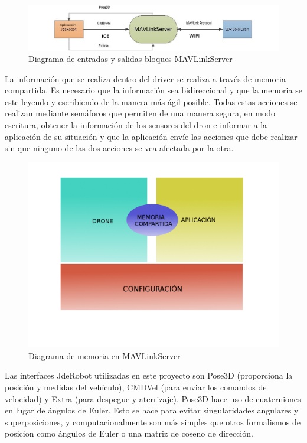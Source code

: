\begin{figure}[H]
  \centering
  \includegraphics[scale=0.65]{imagenes/cajaNegraNueva.png}
  \caption{Diagrama de entradas y salidas bloques MAVLinkServer}
  \label{fig:mavLinkJdeRobotNegra}
\end{figure}

La información que se realiza dentro del driver se realiza a través de memoria compartida. Es necesario que la información sea bidireccional y que la memoria se este leyendo y escribiendo de la manera más ágil posible. Todas estas acciones se realizan mediante semáforos que permiten de una manera segura, en modo escritura, obtener la información de los sensores del dron e informar a la aplicación de su situación y que la aplicación envíe las acciones que debe realizar sin que ninguno de las dos acciones se vea afectada por la otra.

\begin{figure}[H]
  \centering
  \includegraphics[scale=0.2]{imagenes/MEMORIACOMPARTIDA.png}
  \caption{Diagrama de memoria en MAVLinkServer}
  \label{fig:memoriaCompartida}
\end{figure}

Las interfaces JdeRobot utilizadas en este proyecto son Pose3D (proporciona la posición y medidas del vehículo), CMDVel (para enviar los comandos de velocidad) y Extra (para despegue y aterrizaje). Pose3D hace uso de cuaterniones en lugar de ángulos de Euler. Esto se hace para evitar singularidades angulares y superposiciones, y computacionalmente son más simples que otros formalismos de posicion como ángulos de Euler o una matriz de coseno de dirección.

